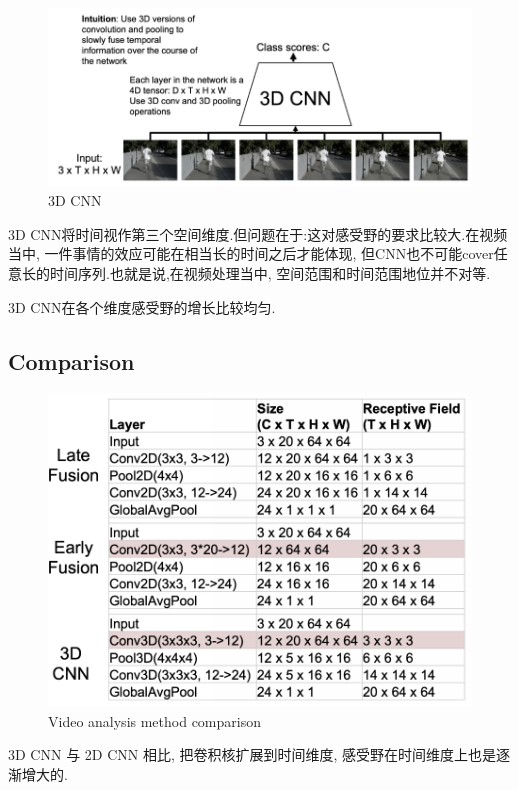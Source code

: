 \begin{figure}[htbp]
    \centering
    \includegraphics[scale=0.25]{figures/3DCNN.png}
    \caption{3D CNN}
\end{figure}

3D CNN将时间视作第三个空间维度.但问题在于:这对感受野的要求比较大.在视频当中,
一件事情的效应可能在相当长的时间之后才能体现,
但CNN也不可能cover任意长的时间序列.也就是说,在视频处理当中,
空间范围和时间范围地位并不对等.

3D CNN在各个维度感受野的增长比较均匀.

\subsection{Comparison}

\begin{figure}[htbp]
    \centering
    \includegraphics[scale=0.35]{figures/video_cmp.png}
    \caption{Video analysis method comparison}
\end{figure}

3D CNN 与 2D CNN 相比, 把卷积核扩展到时间维度, 感受野在时间维度上也是逐渐增大的.

